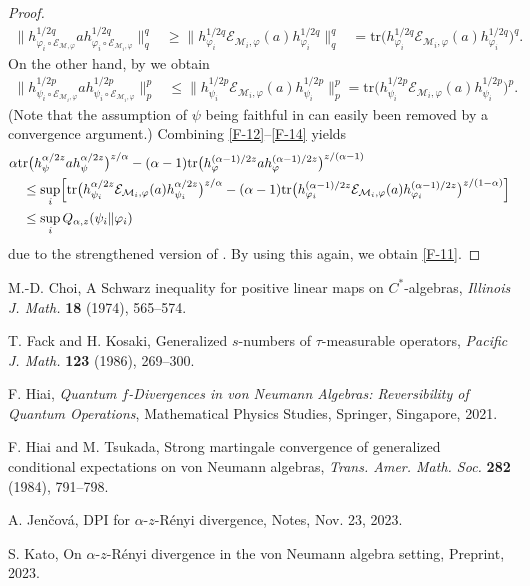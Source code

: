 \documentclass[11pt,reqno]{article}
\numberwithin{equation}{section}
\def\cM{\mathcal{M}}
\def\ffi{\varphi}
\def\tr{\mathrm{tr}}
\def\cE{\mathcal{E}}
\begin{document}
\begin{proof}
\begin{equation}
\begin{aligned}
\big\|h_{\ffi_i\circ\cE_{\cM,\ffi}}^{1/2q}ah_{\ffi_i\circ\cE_{\cM_i,\ffi}}^{1/2q}\big\|_q^q
&\ge\big\|h_{\ffi_i}^{1/2q}\cE_{\cM_i,\ffi}(a)h_{\ffi_i}^{1/2q}\big\|_q^q
&=\tr\bigl(h_{\ffi_i}^{1/2q}\cE_{\cM_i,\ffi}(a)h_{\ffi_i}^{1/2q}\bigr)^q.
\end{aligned}
\end{equation}
On the other hand, by \cite[(1)]{J} we obtain
\begin{align}\label{F-14}
\big\|h_{\psi_i\circ\cE_{\cM_i,\ffi}}^{1/2p}ah_{\psi_i\circ\cE_{\cM_i,\ffi}}^{1/2p}\big\|_p^p
&\le\big\|h_{\psi_i}^{1/2p}\cE_{\cM_i,\ffi}(a)h_{\psi_i}^{1/2p}\big\|_p^p
=\tr\bigl(h_{\psi_i}^{1/2p}\cE_{\cM_i,\ffi}(a)h_{\psi_i}^{1/2p}\bigr)^p.
\end{align}
(Note that the assumption of $\psi$ being faithful in \cite{J} can easily been removed by a convergence
argument.) Combining \eqref{F-12}--\eqref{F-14} yields
\begin{align*}
&\alpha\tr\bigl(h_\psi^{\alpha/2z}ah_\psi^{\alpha/2z}\bigr)^{z/\alpha}
-(\alpha-1)\tr\bigl(h_\ffi^{(\alpha-1)/2z}ah_\ffi^{(\alpha-1)/2z}\bigr)^{z/(\alpha-1)} \\
&\quad\le\sup_i\Bigl[\tr\bigl(h_{\psi_i}^{\alpha/2z}\cE_{\cM_i,\ffi}(a)h_{\psi_i}^{\alpha/2z}\bigr)^{z/\alpha}
-(\alpha-1)\tr\bigl(h_{\ffi_i}^{(\alpha-1)/2z}\cE_{\cM_i,\ffi}(a)h_{\ffi_i}^{(\alpha-1)/2z}\bigr)^{z/(1-\alpha)}\Bigr] \\
&\quad\le\sup_iQ_{\alpha,z}(\psi_i\|\ffi_i)
\end{align*}
due to the strengthened version of \cite[Theorem 2(vi)]{K}. By using this again, we obtain \eqref{F-11}.
\end{proof}

\begin{thebibliography}{99}

M.-D. Choi, A Schwarz inequality for positive linear maps on $C^*$-algebras, {\it Illinois J. Math.}
{\bf 18} (1974), 565--574.

T. Fack and H. Kosaki, Generalized $s$-numbers of $\tau$-measurable operators,
{\it Pacific J. Math.} {\bf 123} (1986), 269--300.

F. Hiai, {\it Quantum $f$-Divergences in von Neumann Algebras: Reversibility of Quantum Operations},
Mathematical Physics Studies, Springer, Singapore, 2021.

F. Hiai and M. Tsukada, Strong martingale convergence of generalized conditional expectations on
von Neumann algebras, {\it Trans. Amer. Math. Soc.} {\bf 282} (1984), 791--798.

A. Jen\v cov\'a, DPI for $\alpha$-$z$-R\'enyi divergence, Notes, Nov. 23, 2023.

S. Kato, On $\alpha$-$z$-R\'enyi divergence in the von Neumann algebra setting, Preprint, 2023.

\end{thebibliography}
\end{document}
